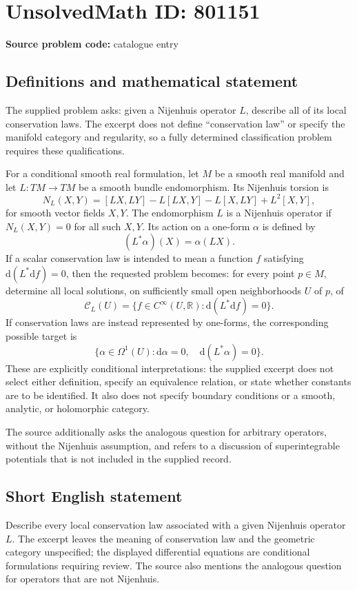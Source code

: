 \documentclass[11pt]{article}
\newcommand{\R}{\mathbb{R}}
\begin{document}
\section*{UnsolvedMath ID: 801151}
\textbf{Source problem code:} catalogue entry
\subsection{Definitions and mathematical statement}
The supplied problem asks: given a Nijenhuis operator \(L\), describe all of its local conservation laws. The excerpt does not define ``conservation law'' or specify the manifold category and regularity, so a fully determined classification problem requires these qualifications.

For a conditional smooth real formulation, let \(M\) be a smooth real manifold and let \(L\colon TM\to TM\) be a smooth bundle endomorphism. Its Nijenhuis torsion is
\[
N_L(X,Y)=[LX,LY]-L[LX,Y]-L[X,LY]+L^2[X,Y],
\]
for smooth vector fields \(X,Y\). The endomorphism \(L\) is a Nijenhuis operator if \(N_L(X,Y)=0\) for all such \(X,Y\). Its action on a one-form \(\alpha\) is defined by
\[
(L^*\alpha)(X)=\alpha(LX).
\]
If a scalar conservation law is intended to mean a function \(f\) satisfying \(\mathrm d(L^*\mathrm df)=0\), then the requested problem becomes: for every point \(p\in M\), determine all local solutions, on sufficiently small open neighborhoods \(U\) of \(p\), of
\[
\mathcal C_L(U)=\bigl\{f\in C^\infty(U,\R):\mathrm d(L^*\mathrm df)=0\bigr\}.
\]
If conservation laws are instead represented by one-forms, the corresponding possible target is
\[
\bigl\{\alpha\in\Omega^1(U):\mathrm d\alpha=0,\quad \mathrm d(L^*\alpha)=0\bigr\}.
\]
These are explicitly conditional interpretations: the supplied excerpt does not select either definition, specify an equivalence relation, or state whether constants are to be identified. It also does not specify boundary conditions or a smooth, analytic, or holomorphic category.

The source additionally asks the analogous question for arbitrary operators, without the Nijenhuis assumption, and refers to a discussion of superintegrable potentials that is not included in the supplied record.
\subsection{Short English statement}
Describe every local conservation law associated with a given Nijenhuis operator \(L\). The excerpt leaves the meaning of conservation law and the geometric category unspecified; the displayed differential equations are conditional formulations requiring review. The source also mentions the analogous question for operators that are not Nijenhuis.
\end{document}
